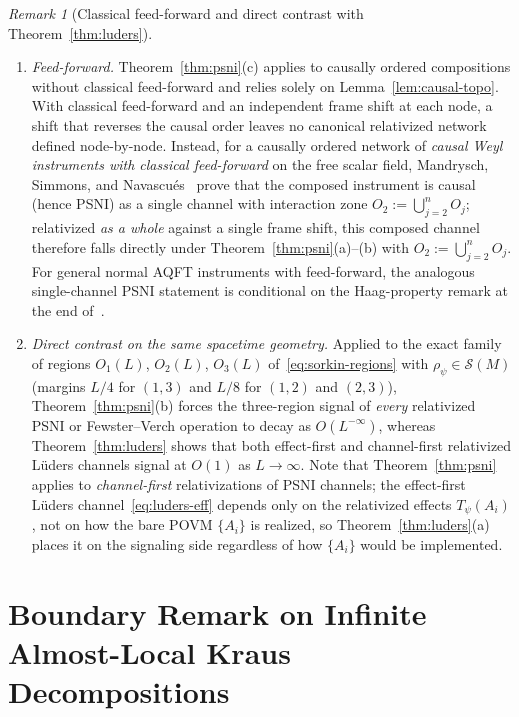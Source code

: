 \documentclass[11pt,a4paper]{article}
\theoremstyle{definition}
\theoremstyle{remark}
\newtheorem{remark}[theorem]{Remark}
\begin{document}
\begin{remark}[Classical feed-forward and direct contrast with Theorem~\ref{thm:luders}]\label{rem:feedforward}
\leavevmode
\begin{enumerate}[label=\textup{(\arabic*)},leftmargin=*,nosep]
\item \emph{Feed-forward.} Theorem~\ref{thm:psni}(c) applies to causally ordered compositions without classical feed-forward and relies solely on Lemma~\ref{lem:causal-topo}. With classical feed-forward and an independent frame shift at each node, a shift that reverses the causal order leaves no canonical relativized network defined node-by-node. Instead, for a causally ordered network of \emph{causal Weyl instruments with classical feed-forward} on the free scalar field, Mandrysch, Simmons, and Navascu\'es~\cite[Thm.~20]{Mandrysch2026} prove that the composed instrument is causal (hence PSNI) as a single channel with interaction zone $O_2 := \bigcup_{j=2}^n O_j$; relativized \emph{as a whole} against a single frame shift, this composed channel therefore falls directly under Theorem~\ref{thm:psni}(a)--(b) with $O_2 := \bigcup_{j=2}^n O_j$. For general normal AQFT instruments with feed-forward, the analogous single-channel PSNI statement is conditional on the Haag-property remark at the end of~\cite[App.~F]{Mandrysch2026}.
\item \emph{Direct contrast on the same spacetime geometry.} Applied to the exact family of regions $O_1(L)$, $O_2(L)$, $O_3(L)$ of~\eqref{eq:sorkin-regions} with $\rho_\psi\in\mathcal{S}(M)$ (margins $L/4$ for $(1,3)$ and $L/8$ for $(1,2)$ and $(2,3)$), Theorem~\ref{thm:psni}(b) forces the three-region signal of \emph{every} relativized PSNI or Fewster--Verch operation to decay as $O(L^{-\infty})$, whereas Theorem~\ref{thm:luders} shows that both effect-first and channel-first relativized L\"uders channels signal at $O(1)$ as $L\to\infty$. Note that Theorem~\ref{thm:psni} applies to \emph{channel-first} relativizations of PSNI channels; the effect-first L\"uders channel~\eqref{eq:luders-eff} depends only on the relativized effects $T_\psi(A_i)$, not on how the bare POVM $\{A_i\}$ is realized, so Theorem~\ref{thm:luders}(a) places it on the signaling side regardless of how $\{A_i\}$ would be implemented.
\end{enumerate}
\end{remark}

\section{Boundary Remark on Infinite Almost-Local Kraus Decompositions}
\label{sec:kraus}
\end{document}
